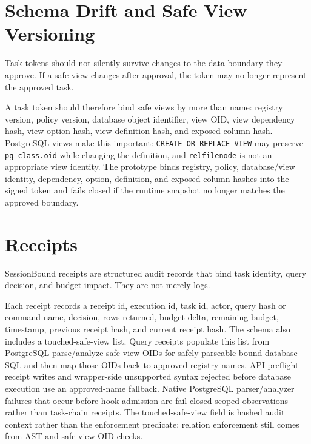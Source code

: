 \documentclass[journal]{IEEEtran}
\begin{document}
\hypertarget{schema-drift-and-safe-view-versioning}{%
\section{Schema Drift and Safe View
Versioning}\label{schema-drift-and-safe-view-versioning}}

Task tokens should not silently survive changes to the data boundary
they approve. If a safe view changes after approval, the token may no
longer represent the approved task.

A task token should therefore bind safe views by more than name:
registry version, policy version, database object identifier, view OID,
view dependency hash, view option hash, view definition hash, and
exposed-column hash. PostgreSQL views make this important:
\texttt{CREATE\ OR\ REPLACE\ VIEW} may preserve \texttt{pg\_class.oid}
while changing the definition, and \texttt{relfilenode} is not an
appropriate view identity. The prototype binds registry, policy,
database/view identity, dependency, option, definition, and exposed-column
hashes into the signed token and fails closed if the runtime snapshot no
longer matches the approved boundary.


\hypertarget{receipts}{%
\section{Receipts}\label{receipts}}

SessionBound receipts are structured audit records that bind task
identity, query decision, and budget impact. They are not merely logs.

Each receipt records a receipt id, execution id, task id, actor, query hash or
command name, decision, rows returned, budget delta, remaining budget,
timestamp, previous receipt hash, and current receipt hash. The schema
also includes a touched-safe-view list. Query receipts populate this list
from PostgreSQL parse/analyze safe-view OIDs for safely parseable bound
database SQL and then map those OIDs back to approved registry names. API
preflight receipt writes and wrapper-side unsupported syntax rejected
before database execution use an approved-name fallback. Native
PostgreSQL parser/analyzer failures that occur before hook admission are
fail-closed scoped observations rather than task-chain receipts. The
touched-safe-view field is hashed audit context rather than the
enforcement predicate; relation enforcement still comes from AST and
safe-view OID checks.
\end{document}
